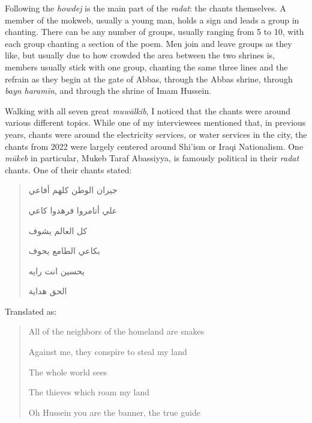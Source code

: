 

Following the \emph{howdej} is the main part of the \emph{radat}: the chants themselves. A member of the mokweb, usually a young man, holds a sign and leads a group in chanting. There can be any number of groups, usually ranging from 5 to 10, with each group chanting a section of the poem. Men join and leave groups as they like, but usually due to how crowded the area between the two shrines is, members usually stick with one group, chanting the same three lines and the refrain as they begin at the gate of Abbas, through the Abbas shrine, through \emph{bayn haramīn}, and through the shrine of Imam Hussein. 

Walking with all seven great \emph{muwālkib}, I noticed that the chants were around various different topics. While one of my interviewees mentioned that, in previous years, chants were around the electricity services, or water services in the city, the chants from 2022 were largely centered around Shi'ism or Iraqi Nationalism. One \emph{mūkeb} in particular, Mukeb Taraf Abassiyya, is famously political in their \emph{radat} chants. One of their chants stated: 

\begin{quote}
\begin{Arabic}
جيران الوطن كلهم أفاعي

علي أتامروا فرهدوا كاعي

كل العالم يشوف

بكاعي الطامع يحوف

يحسين انت رايه

الحق هداية
\end{Arabic}
\end{quote}

Translated as: 
\begin{quote}
All of the neighbors of the homeland are snakes

Against me, they conspire to steal my land

The whole world sees

The thieves which roam my land

Oh Hussein you are the banner, the true guide
\end{quote}

